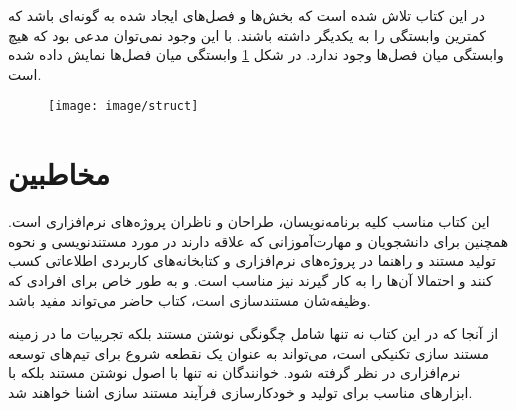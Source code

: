 در این کتاب تلاش شده است که بخش‌ها و فصل‌های ایجاد شده به گونه‌ای باشد که کمترین
وابستگی را به یکدیگر داشته باشند. با این وجود نمی‌توان مدعی بود که هیچ وابستگی
میان فصل‌ها وجود ندارد. در شکل \ref{image/struct}
وابستگی میان فصل‌ها نمایش داده شده است.

\begin{figure}
\centering
\texttt{[image: image/struct]}
\label{image/struct}
\end{figure}


\section{مخاطبین}

این کتاب مناسب کلیه برنامه‌نویسان، طراحان و ناظران پروژه‌های نرم‌افزاری است.
همچنین برای دانشجویان و مهارت‌آموزانی که علاقه دارند در مورد مستندنویسی و نحوه
تولید مستند و راهنما در پروژه‌های نرم‌افزاری و کتابخانه‌های کاربردی اطلاعاتی کسب
کنند و احتمالا آن‌ها را به کار گیرند نیز مناسب است. و به طور خاص برای افرادی که
وظیفه‌شان مستندسازی است، کتاب حاضر می‌تواند مفید باشد.

از آنجا که در این کتاب نه تنها شامل چگونگی نوشتن مستند بلکه تجربیات ما در زمینه
مستند سازی تکنیکی است، می‌تواند به عنوان یک نقطعه شروع برای تیم‌های توسعه
نرم‌افزاری در نظر گرفته شود. خوانندگان نه تنها با اصول نوشتن مستند بلکه با
ابزارهای مناسب برای تولید و خودکارسازی فرآیند مستند سازی اشنا خواهند شد.


